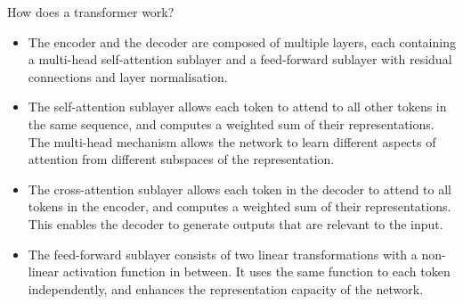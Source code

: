 \documentclass[USenglish,pdftex,compress,10pt,svgnamesi,handout]{beamer}
\begin{document}
\begin{frame}{How does a transformer work?}
\begin{figure}
    \centering
\end{figure}
\begin{itemize}
    \item The encoder and the decoder are composed of multiple layers, each containing a multi-head self-attention sublayer and a feed-forward sublayer with residual connections and layer normalisation.
    \item The self-attention sublayer allows each token to attend to all other tokens in the same sequence, and computes a weighted sum of their representations. The multi-head mechanism allows the network to learn different aspects of attention from different subspaces of the representation.
    \item The cross-attention sublayer allows each token in the decoder to attend to all tokens in the encoder, and computes a weighted sum of their representations. This enables the decoder to generate outputs that are relevant to the input.
    \item The feed-forward sublayer consists of two linear transformations with a non-linear activation function in between. It uses the same function to each token independently, and enhances the representation capacity of the network.
\end{itemize}
\end{frame}
\end{document}
